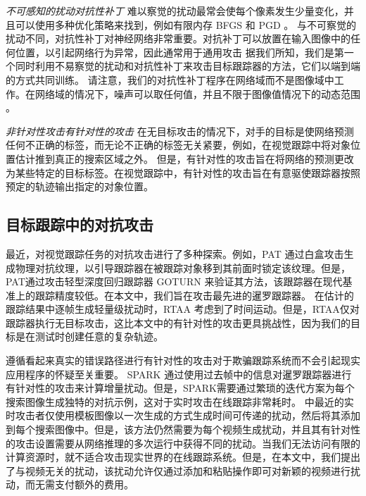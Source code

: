 \textit{不可感知的扰动对抗性补丁} 难以察觉的扰动最常会使每个像素发生少量变化，并且可以使用多种优化策略来找到，例如有限内存 BFGS \cite{intriguing} 和 PGD \cite{PGD}。
与不可察觉的扰动不同，对抗性补丁对神经网络非常重要。对抗补丁可以放置在输入图像中的任何位置，以引起网络行为异常，因此通常用于通用攻击 \cite{patch}
据我们所知，我们是第一个同时利用不易察觉的扰动和对抗性补丁来攻击目标跟踪器的方法，它们以端到端的方式共同训练。
请注意，我们的对抗性补丁程序在网络域而不是图像域中工作。在网络域的情况下，噪声可以取任何值，并且不限于图像值情况下的动态范围 \cite{karmon2018lavan}。

\textit{非针对性攻击有针对性的攻击} 在无目标攻击的情况下，对手的目标是使网络预测任何不正确的标签，而无论不正确的标签无关紧要，例如，在视觉跟踪中将对象位置估计推到真正的搜索区域之外。
但是，有针对性的攻击旨在将网络的预测更改为某些特定的目标标签。在视觉跟踪中，有针对性的攻击旨在有意驱使跟踪器按照预定的轨迹输出指定的对象位置。

\subsection{目标跟踪中的对抗攻击}

最近，对视觉跟踪任务的对抗攻击进行了多种探索。例如，PAT \cite{PAT} 通过白盒攻击生成物理对抗纹理，以引导跟踪器在被跟踪对象移到其前面时锁定该纹理。但是，PAT通过攻击轻型深度回归跟踪器 GOTURN \cite{GOTURN}来验证其方法，该跟踪器在现代基准上的跟踪精度较低。在本文中，我们旨在攻击最先进的暹罗跟踪器。
在估计的跟踪结果中逐帧生成轻量级扰动时，RTAA \cite{RTAA} 考虑到了时间运动。但是，RTAA仅对跟踪器执行无目标攻击，这比本文中的有针对性的攻击更具挑战性，因为我们的目标是在测试时创建任意的复杂轨迹。

遵循看起来真实的错误路径进行有针对性的攻击对于欺骗跟踪系统而不会引起现实应用程序的怀疑至关重要。
SPARK \cite{SPARK} 通过使用过去帧中的信息对暹罗跟踪器进行有针对性的攻击来计算增量扰动。但是，SPARK需要通过繁琐的迭代方案为每个搜索图像生成独特的对抗示例，这对于实时攻击在线跟踪非常耗时。\cite{TTP} 中最近的实时攻击者仅使用模板图像以一次生成的方式生成时间可传递的扰动，然后将其添加到每个搜索图像中。但是，该方法仍然需要为每个视频生成扰动，并且其有针对性的攻击设置需要从网络推理的多次运行中获得不同的扰动。当我们无法访问有限的计算资源时，就不适合攻击现实世界的在线跟踪系统。但是，在本文中，我们提出了与视频无关的扰动，该扰动允许仅通过添加和粘贴操作即可对新颖的视频进行扰动，而无需支付额外的费用。

